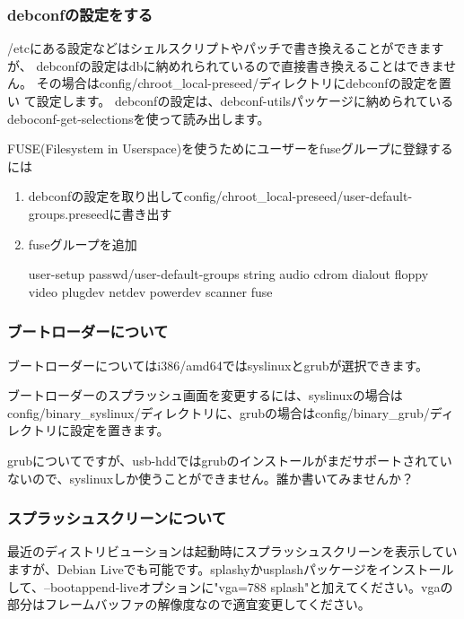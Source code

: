 \documentclass[mingoth,a4paper]{jsarticle}
\begin{document}
\subsubsection{debconfの設定をする}
/etcにある設定などはシェルスクリプトやパッチで書き換えることができますが、
debconfの設定はdbに納めれられているので直接書き換えることはできません。
その場合はconfig/chroot\_local-preseed/ディレクトリにdebconfの設定を置い
て設定します。
debconfの設定は、debconf-utilsパッケージに納められているdeboconf-get-selectionsを使って読み出します。

\newpage

FUSE(Filesystem in Userspace)を使うためにユーザーをfuseグループに登録するには

\begin{enumerate}
 \item debconfの設定を取り出してconfig/chroot\_local-preseed/user-default-groups.preseedに書き出す
 \item fuseグループを追加
 \begin{commandline}
user-setup      passwd/user-default-groups      string  audio cdrom dialout floppy video plugdev netdev powerdev scanner fuse
 \end{commandline}
\end{enumerate}

\subsubsection{ブートローダーについて}
ブートローダーについてはi386/amd64ではsyslinuxとgrubが選択できます。

ブートローダーのスプラッシュ画面を変更するには、syslinuxの場合はconfig/binary\_syslinux/ディレクトリに、grubの場合はconfig/binary\_grub/ディレクトリに設定を置きます。

grubについてですが、usb-hddではgrubのインストールがまだサポートされていないので、syslinuxしか使うことができません。誰か書いてみませんか？

\subsubsection{スプラッシュスクリーンについて}
最近のディストリビューションは起動時にスプラッシュスクリーンを表示していますが、Debian Liveでも可能です。splashyかusplashパッケージをインストールして、--bootappend-liveオプションに"vga=788 splash"と加えてください。vgaの部分はフレームバッファの解像度なので適宜変更してください。
\end{document}
